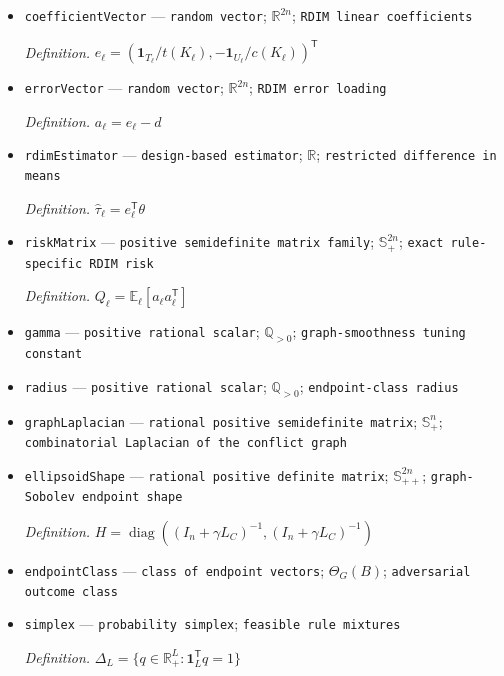 \documentclass{article}
\begin{document}
\begin{itemize}
  \par\smallskip\noindent\emph{Definition.} \(U_{\ell}=S_{\ell}\setminus T_{\ell}\)
  \item \texttt{coefficientVector} --- \texttt{random vector}; \(\mathbb R^{2n}\); \texttt{RDIM linear coefficients}
  \par\smallskip\noindent\emph{Definition.} \(e_{\ell}=(\mathbf 1_{T_{\ell}}/t(K_{\ell}),-\mathbf 1_{U_{\ell}}/c(K_{\ell}))^{\mathsf T}\)
  \item \texttt{errorVector} --- \texttt{random vector}; \(\mathbb R^{2n}\); \texttt{RDIM error loading}
  \par\smallskip\noindent\emph{Definition.} \(a_{\ell}=e_{\ell}-d\)
  \item \texttt{rdimEstimator} --- \texttt{design-\allowbreak{}based estimator}; \(\mathbb R\); \texttt{restricted difference in means}
  \par\smallskip\noindent\emph{Definition.} \(\widehat\tau_{\ell}=e_{\ell}^{\mathsf T}\theta\)
  \item \texttt{riskMatrix} --- \texttt{positive semidefinite matrix family}; \(\mathbb S_+^{2n}\); \texttt{exact rule-\allowbreak{}specific RDIM risk}
  \par\smallskip\noindent\emph{Definition.} \(Q_{\ell}=\mathbb E_{\ell}[a_{\ell}a_{\ell}^{\mathsf T}]\)
  \item \texttt{gamma} --- \texttt{positive rational scalar}; \(\mathbb Q_{>0}\); \texttt{graph-\allowbreak{}smoothness tuning constant}
  \item \texttt{radius} --- \texttt{positive rational scalar}; \(\mathbb Q_{>0}\); \texttt{endpoint-\allowbreak{}class radius}
  \item \texttt{graphLaplacian} --- \texttt{rational positive semidefinite matrix}; \(\mathbb S_+^n\); \texttt{combinatorial Laplacian of the conflict graph}
  \item \texttt{ellipsoidShape} --- \texttt{rational positive definite matrix}; \(\mathbb S_{++}^{2n}\); \texttt{graph-\allowbreak{}Sobolev endpoint shape}
  \par\smallskip\noindent\emph{Definition.} \(H=\operatorname{diag}((I_n+\gamma L_C)^{-1},(I_n+\gamma L_C)^{-1})\)
  \item \texttt{endpointClass} --- \texttt{class of endpoint vectors}; \(\Theta_G(B)\); \texttt{adversarial outcome class}
  \item \texttt{simplex} --- \texttt{probability simplex}; \texttt{feasible rule mixtures}
  \par\smallskip\noindent\emph{Definition.} \(\Delta_L=\{q\in\mathbb R_+^L:\mathbf 1_L^{\mathsf T}q=1\}\)

\end{itemize}
\end{document}
